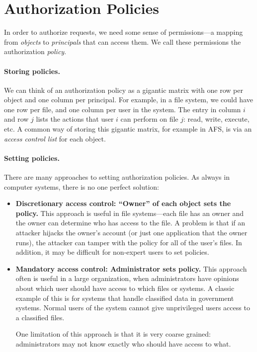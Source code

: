 \section{Authorization Policies}
In order to authorize requests, we need some sense of permissions---a mapping from \emph{objects} to \emph{principals} that can access them. We call these permissions the authorization \emph{policy}.

\paragraph{Storing policies.}
We can think of an authorization policy as a gigantic matrix with one row per object
and one column per principal.
For example, in a file system, we could have one row per file, and one column per user
in the system.
The entry in column $i$ and row $j$ lists the actions that user $i$ can perform 
on file $j$: read, write, execute, etc.
A common way of storing this gigantic matrix, for
example in AFS, is via an \emph{access control
list} for each object. 

\paragraph{Setting policies.}
There are many approaches to setting authorization policies.
As always in computer systems, there is no one perfect solution:

\begin{itemize}
\item \textbf{Discretionary access control: ``Owner'' of each object sets the policy.}
      This approach is useful in file systems---each file has an owner and 
      the owner can determine who has access to the file.
      A problem is that if an attacker hijacks the owner's account
      (or just one application that the owner runs), the attacker
      can tamper with the policy for all of the user's files.
      In addition, it may be difficult for non-expert users to 
      set policies.
      

\item \textbf{Mandatory access control: Administrator sets policy.}
      This approach often is useful in a large organization, when
      administrators have opinions about which user should have 
      access to which files or systems.
      A classic example of this is for systems that handle
      classified data in government systems. Normal users of the
      system cannot give unprivileged users access to a classified files.

      One limitation of this approach is that it is very coarse
      grained: administrators may not know exactly who should have
      access to what.
      
\end{itemize}

